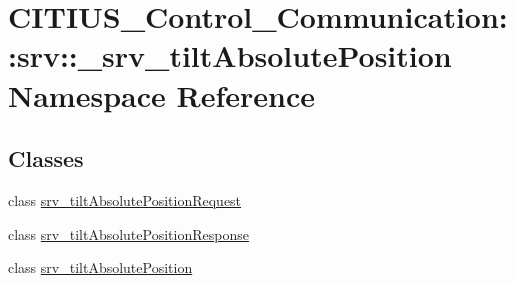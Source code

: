 \hypertarget{namespace_c_i_t_i_u_s___control___communication_1_1srv_1_1__srv__tilt_absolute_position}{\section{\-C\-I\-T\-I\-U\-S\-\_\-\-Control\-\_\-\-Communication\-:\-:srv\-:\-:\-\_\-srv\-\_\-tilt\-Absolute\-Position \-Namespace \-Reference}
\label{namespace_c_i_t_i_u_s___control___communication_1_1srv_1_1__srv__tilt_absolute_position}
}
\subsection*{\-Classes}
\begin{DoxyCompactItemize}
\item 
class \hyperlink{class_c_i_t_i_u_s___control___communication_1_1srv_1_1__srv__tilt_absolute_position_1_1srv__tilt_absolute_position_request}{srv\-\_\-tilt\-Absolute\-Position\-Request}
\item 
class \hyperlink{class_c_i_t_i_u_s___control___communication_1_1srv_1_1__srv__tilt_absolute_position_1_1srv__tilt_absolute_position_response}{srv\-\_\-tilt\-Absolute\-Position\-Response}
\item 
class \hyperlink{class_c_i_t_i_u_s___control___communication_1_1srv_1_1__srv__tilt_absolute_position_1_1srv__tilt_absolute_position}{srv\-\_\-tilt\-Absolute\-Position}
\end{DoxyCompactItemize}
